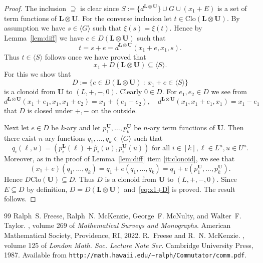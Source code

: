 \documentclass[10pt,a4paper]{amsart}
\numberwithin{equation}{section}
\newcommand{\st}{\ :\ }
\renewcommand{\L}{\mathbf{L}}
\newcommand{\U}{\mathbf{U}}
\newcommand{\Clo}{\mathrm{Clo}}
\begin{document}
\begin{proof}
  The inclusion $\supseteq$ is clear since $S :=  \{d^{\L\otimes\U}\} \cup G \cup (x_1+E)$ 
    is a set of term functions of $\L\otimes\U$.
  For the converse inclusion let $t\in\Clo(\L\otimes\U)$. 
  By assumption we have $s\in\langle G\rangle$ such that $\xi(s) = \xi(t)$. 
  Hence by Lemma~\ref{lem:diff} we have $e\in D(\L\otimes\U)$ such that
    \[ t=s+e = d^{\L\otimes\U}(x_1+e,x_1,s). \]
  Thus $t\in\langle S\rangle$ follows once we have proved that
    \begin{equation} \label{eq:x1+D} 
      x_1+D(\L\otimes\U) \subseteq \langle S\rangle.
    \end{equation}
  For this we show that
    \[ D := \{e\in D(\L\otimes\U) \st x_1+e \in \langle S\rangle \} \]
    is a clonoid from $\U$ to $(L,+,-,0)$. 
  Clearly $0\in D$. For $e_1,e_2\in D$ we see from
    \[ d^{\L\otimes\U}(x_1+e_1, x_1, x_1+e_2) = x_1+(e_1+e_2),\quad d^{\L\otimes\U}(x_1,x_1+e_1,x_1) = x_1-e_1 \]
    that $D$ is closed under $+,-$ on the outside.

  Next let $e\in D$ be $k$-ary and let $p_1^\U,\dots,p_k^\U$ be $n$-ary term functions of $\U$. 
  Then there exist $n$-ary functions $q_1,\dots,q_k\in\langle G\rangle$ such that
    \[q_{i}(\ell,u) = (p_{i}^\L(\ell)+ \hat{p}_{i}(u), p_{i}^\U(u)) \text{ for all } i\in [k],\ell\in L^n,u\in U^n.\]
  Moreover, as in the proof of Lemma~\ref{lem:diff} item \ref{it:clonoid}, we see that
    \[ (x_1+e)(q_1,\dots,q_k) = q_1+e(q_{1},\dots,q_{k}) = q_1+e(p_1^\U,\dots,p_k^\U). \]
  Hence $D \Clo(\U) \subseteq D$. Thus $D$ is a clonoid from  $\U$ to $(L,+,-,0)$. Since $E\subseteq D$ by definition,
    $D=D(\L\otimes\U)$ and~\eqref{eq:x1+D} is proved. The result follows.
\end{proof}


\begin{thebibliography}{99}
 Ralph~S. Freese, Ralph~N. McKenzie, George~F. McNulty, and Walter~F. Taylor. , volume 269 of {\em Mathematical Surveys and Monographs}. \newblock American Mathematical Society, Providence, RI, 2022.
 R.~Freese and R.~N. McKenzie. , volume 125 of {\em London Math. Soc. Lecture Note Ser.} \newblock Cambridge University Press, 1987. \newblock Available from \verb+http://math.hawaii.edu/~ralph/Commutator/comm.pdf+.
\end{thebibliography}
\end{document}
